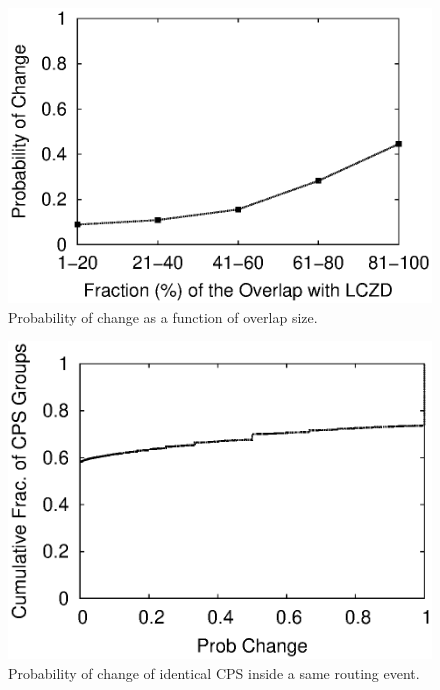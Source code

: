 
\begin{figure}
\begin{center}
\includegraphics[width=1.05\columnwidth]{figs/patching/probchange/probchange.eps}
\caption{Probability of change as a function of overlap size.}
\label{fig:overlap.change.prob}
\end{center}
\end{figure}

\begin{figure}
\begin{center}
\includegraphics[width=1.05\columnwidth]{figs/patching/probcpschange/prob_cps.eps}
\caption{Probability of change of identical CPS inside a same routing event.}
\label{fig:cps.change.prob}
\end{center}
\end{figure}


